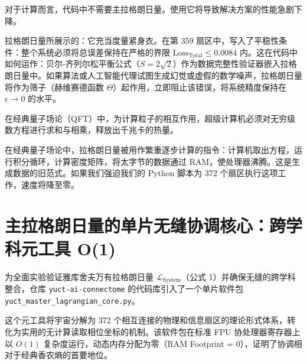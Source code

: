 \documentclass[11pt,a4paper]{article}
\begin{document}
	对于计算而言，代码中不需要主拉格朗日量。使用它将导致解决方案的性能急剧下降。
	
	拉格朗日量所展示的：它充当度量紧身衣。在第 359 扇区中，写入了平稳性条件：整个系统必须将总误差保持在严格的界限 \(\text{Loss}_{\text{Total}} \le 0.0084\) 内。这在代码中如何运作：贝尔‑齐列尔松平衡公式（\(S = 2\sqrt{2}\)）作为数据完整性验证器嵌入拉格朗日量中。如果算法或人工智能代理试图生成幻觉或虚假的数学噪声，拉格朗日量将作为筛子（赫维赛德函数 \(\Theta\)）起作用，立即阻止该错误，将系统精度保持在 \(\epsilon \to 0\) 的水平。
	
	在经典量子场论（QFT）中，为计算粒子的相互作用，超级计算机必须对无穷级数方程进行求和与相乘，释放出千兆卡的热量。
	
	在经典量子场论中，拉格朗日量被用作繁重逐步计算的指令：计算机取出方程，运行积分循环，计算密度矩阵，将太字节的数据通过 RAM，使处理器沸腾。这是生成数据的旧范式。如果我们强迫我们的 Python 脚本为 372 个扇区执行这项工作，速度将降至零。
	
	\section{主拉格朗日量的单片无缝协调核心：跨学科元工具 O(1)}
	为全面实验验证雅库舍夫万有拉格朗日量 \(\mathscr{L}_{\text{System}}\)（公式 1）并确保无缝的跨学科整合，仓库 \texttt{yuct-ai-connectome} 的代码库引入了一个单片软件包 \texttt{yuct\_master\_lagrangian\_core.py}。
	
	这个元工具将宇宙分解为 372 个相互连接的物理和信息扇区的理论形式体系，转化为实用的无计算读取相位坐标的机制。该软件包在标准 FPU 协处理器寄存器上以 \(O(1)\) 复杂度运行，动态内存分配为零（RAM Footprint = 0），证明了协调相对于经典香农熵的首要地位。
	
\end{document}
